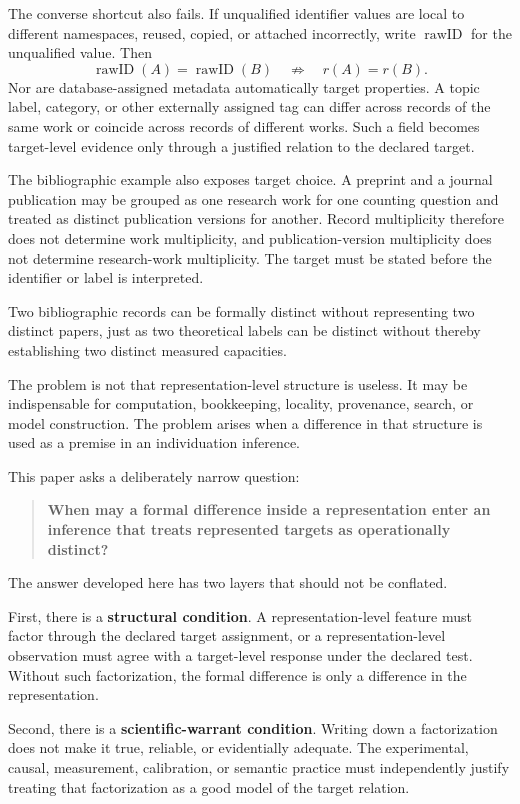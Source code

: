 \documentclass[12pt]{article}
\begin{document}
The converse shortcut also fails. If unqualified identifier values are local to different namespaces, reused, copied, or attached incorrectly, write \(\operatorname{rawID}\) for the unqualified value. Then
\[
\operatorname{rawID}(A)=\operatorname{rawID}(B)
\quad\not\Rightarrow\quad
r(A)=r(B).
\]
Nor are database-assigned metadata automatically target properties. A topic label, category, or other externally assigned tag can differ across records of the same work or coincide across records of different works. Such a field becomes target-level evidence only through a justified relation to the declared target.

The bibliographic example also exposes target choice. A preprint and a journal publication may be grouped as one research work for one counting question and treated as distinct publication versions for another. Record multiplicity therefore does not determine work multiplicity, and publication-version multiplicity does not determine research-work multiplicity. The target must be stated before the identifier or label is interpreted.

Two bibliographic records can be formally distinct without representing two distinct papers, just as two theoretical labels can be distinct without thereby establishing two distinct measured capacities.

The problem is not that representation-level structure is useless. It may be indispensable for computation, bookkeeping, locality, provenance, search, or model construction. The problem arises when a difference in that structure is used as a premise in an individuation inference.

This paper asks a deliberately narrow question:

\begin{quote}
\textbf{When may a formal difference inside a representation enter an inference that treats represented targets as operationally distinct?}
\end{quote}

The answer developed here has two layers that should not be conflated.

First, there is a \textbf{structural condition}. A representation-level feature must factor through the declared target assignment, or a representation-level observation must agree with a target-level response under the declared test. Without such factorization, the formal difference is only a difference in the representation.

Second, there is a \textbf{scientific-warrant condition}. Writing down a factorization does not make it true, reliable, or evidentially adequate. The experimental, causal, measurement, calibration, or semantic practice must independently justify treating that factorization as a good model of the target relation.
\end{document}
